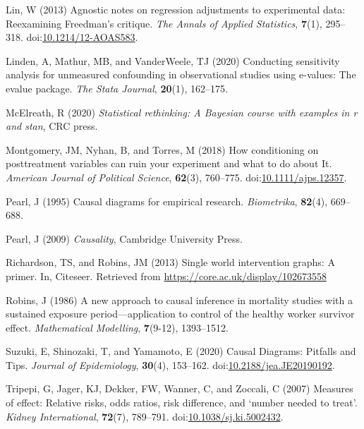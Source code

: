 \documentclass[
  single column]{article}
\newlength{\cslhangindent}
\newenvironment{CSLReferences}[2] %
 {\begin{list}{}{%
  \setlength{\itemindent}{0pt}
  \setlength{\leftmargin}{0pt}
  \setlength{\parsep}{0pt}
  \ifodd #1
   \setlength{\leftmargin}{\cslhangindent}
   \setlength{\itemindent}{-1\cslhangindent}
  \fi
  \setlength{\itemsep}{#2\baselineskip}}}
 {\end{list}}
\begin{document}
\begin{CSLReferences}{1}{0}
Lin, W (2013) {Agnostic notes on regression adjustments to experimental
data: Reexamining Freedman's critique}. \emph{The Annals of Applied
Statistics}, \textbf{7}(1), 295--318.
doi:\href{https://doi.org/10.1214/12-AOAS583}{10.1214/12-AOAS583}.

Linden, A, Mathur, MB, and VanderWeele, TJ (2020) Conducting sensitivity
analysis for unmeasured confounding in observational studies using
e-values: The evalue package. \emph{The Stata Journal}, \textbf{20}(1),
162--175.

McElreath, R (2020) \emph{Statistical rethinking: A {B}ayesian course
with examples in r and stan}, CRC press.

Montgomery, JM, Nyhan, B, and Torres, M (2018) How conditioning on
posttreatment variables can ruin your experiment and what to do about
It. \emph{American Journal of Political Science}, \textbf{62}(3),
760--775.
doi:\href{https://doi.org/10.1111/ajps.12357}{10.1111/ajps.12357}.

Pearl, J (1995) Causal diagrams for empirical research.
\emph{Biometrika}, \textbf{82}(4), 669--688.

Pearl, J (2009) \emph{Causality}, Cambridge University Press.

Richardson, TS, and Robins, JM (2013) Single world intervention graphs:
A primer. In, Citeseer. Retrieved from
\url{https://core.ac.uk/display/102673558}

Robins, J (1986) A new approach to causal inference in mortality studies
with a sustained exposure period---application to control of the healthy
worker survivor effect. \emph{Mathematical Modelling}, \textbf{7}(9-12),
1393--1512.

Suzuki, E, Shinozaki, T, and Yamamoto, E (2020) Causal Diagrams:
Pitfalls and Tips. \emph{Journal of Epidemiology}, \textbf{30}(4),
153--162.
doi:\href{https://doi.org/10.2188/jea.JE20190192}{10.2188/jea.JE20190192}.

Tripepi, G, Jager, KJ, Dekker, FW, Wanner, C, and Zoccali, C (2007)
Measures of effect: Relative risks, odds ratios, risk difference, and
{`}number needed to treat{'}. \emph{Kidney International},
\textbf{72}(7), 789--791.
doi:\href{https://doi.org/10.1038/sj.ki.5002432}{10.1038/sj.ki.5002432}.


\end{CSLReferences}
\end{document}
